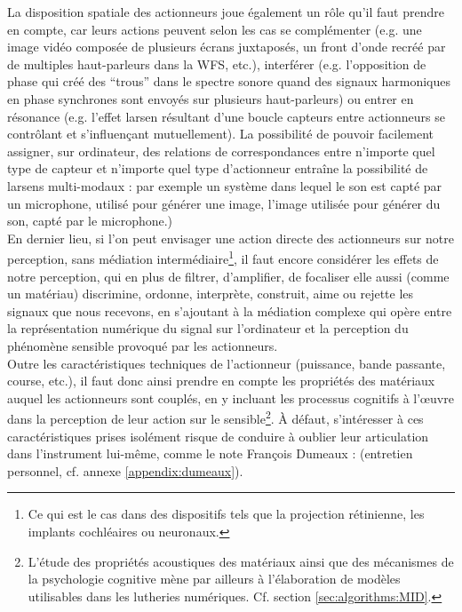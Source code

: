 \indent La disposition spatiale des actionneurs joue également un rôle qu'il faut prendre en compte, car leurs actions peuvent selon les cas se complémenter (e.g. une image vidéo composée de plusieurs écrans juxtaposés, un front d'onde recréé par de multiples haut-parleurs dans la \gls{WFS}, etc.), interférer (e.g. l'opposition de phase qui créé des ``trous'' dans le spectre sonore quand des signaux harmoniques en phase synchrones sont envoyés sur plusieurs haut-parleurs) ou entrer en résonance (e.g. l'effet larsen résultant d'une boucle capteurs entre actionneurs se contrôlant et s'influençant mutuellement). La possibilité de pouvoir facilement assigner, sur ordinateur, des relations de correspondances entre n'importe quel type de capteur et n'importe quel type d'actionneur entraîne la possibilité de larsens multi-modaux : par exemple un système dans lequel le son est capté par un microphone, utilisé pour générer une image, l'image utilisée pour générer du son, capté par le microphone.)\\
\indent En dernier lieu, si l'on peut envisager une action directe des actionneurs sur notre perception, sans médiation intermédiaire\footnote{Ce qui est le cas dans des dispositifs tels que la projection rétinienne, les implants cochléaires ou neuronaux.}, il faut encore considérer les effets de notre perception, qui en plus de filtrer, d'amplifier, de focaliser elle aussi (comme un matériau) discrimine, ordonne, interprète, construit, aime ou rejette les signaux que nous recevons, en s'ajoutant à la médiation complexe qui opère entre la représentation numérique du signal sur l'ordinateur et la perception du phénomène sensible provoqué par les actionneurs.\\
\indent Outre les caractéristiques techniques de l'actionneur (puissance, bande passante, course, etc.), il faut donc ainsi prendre en compte les propriétés des matériaux auquel les actionneurs sont couplés, en y incluant les processus cognitifs à l'œuvre dans la perception de leur action sur le sensible\footnote{L'étude des propriétés acoustiques des matériaux ainsi que des mécanismes de la psychologie cognitive mène par ailleurs à l'élaboration de modèles utilisables dans les lutheries numériques. Cf. section \ref{sec:algorithms:MID}.}. À défaut, s'intéresser à ces caractéristiques prises isolément risque de conduire à oublier leur articulation dans l'instrument lui-même, comme le note François Dumeaux :  (entretien personnel, cf. annexe \ref{appendix:dumeaux}).

